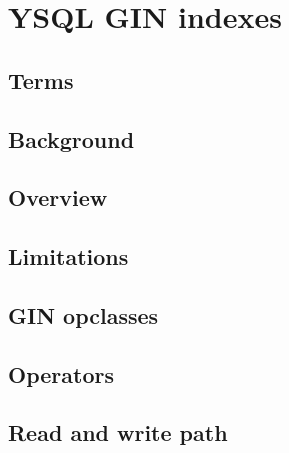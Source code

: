 \documentclass[11pt]{article}
\begin{document}
\hypertarget{ysql-gin-indexes}{%
\section{YSQL GIN indexes}\label{ysql-gin-indexes}}

\hypertarget{terms}{%
\subsection{Terms}\label{terms}}

\hypertarget{background}{%
\subsection{Background}\label{background}}

\hypertarget{overview}{%
\subsection{Overview}\label{overview}}

\hypertarget{limitations}{%
\subsection{Limitations}\label{limitations}}

\hypertarget{gin-opclasses}{%
\subsection{GIN opclasses}\label{gin-opclasses}}

\hypertarget{operators}{%
\subsection{Operators}\label{operators}}

\hypertarget{read-and-write-path}{%
\subsection{Read and write path}\label{read-and-write-path}}
\end{document}
